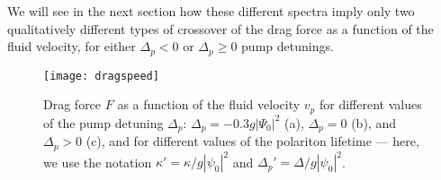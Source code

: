 We will see in the next section how these different spectra imply only
two qualitatively different types of crossover of the drag force as a
function of the fluid velocity, for either $\Delta_p < 0$ or
$\Delta_p \ge 0$ pump detunings.

%
\begin{figure}[tb]\centering
\texttt{[image: dragspeed]} %
\caption{
%
Drag force $F$ as a function of the fluid velocity
$v_p$ for different values of the pump detuning $\Delta_p$:
$\Delta_p=-0.3g|\Psi_0|^2$ (a), $\Delta_p=0$ (b), and $\Delta_p>0$
(c), and for different values of the polariton lifetime --- here, we
use the notation $\kappa' = \kappa/g|\psi_0|^2$ and $\Delta_p' =
\Delta/g|\psi_0|^2$.
%
}\label{fig:dragv}
\end{figure}


